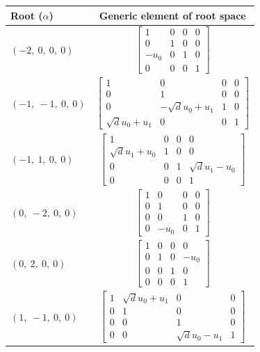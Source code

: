 \documentclass[11pt]{article}
\theoremstyle{definition}
\begin{document}
\noindent \begin{tabular}{|l|c|}
    \hline
    \textbf{Root ($\alpha$)} & \textbf{Generic element of root space} \\
    \hline
    $\left( -2, \  0, \  0, \  0\right)$ & $\left[\begin{matrix}1 & 0 & 0 & 0\\0 & 1 & 0 & 0\\- u_{0} & 0 & 1 & 0\\0 & 0 & 0 & 1\end{matrix}\right]$ \\
    \hline
    $\left( -1, \  -1, \  0, \  0\right)$ & $\left[\begin{matrix}1 & 0 & 0 & 0\\0 & 1 & 0 & 0\\0 & - \sqrt{d} u_{0} + u_{1} & 1 & 0\\\sqrt{d} u_{0} + u_{1} & 0 & 0 & 1\end{matrix}\right]$ \\
    \hline
    $\left( -1, \  1, \  0, \  0\right)$ & $\left[\begin{matrix}1 & 0 & 0 & 0\\\sqrt{d} u_{1} + u_{0} & 1 & 0 & 0\\0 & 0 & 1 & \sqrt{d} u_{1} - u_{0}\\0 & 0 & 0 & 1\end{matrix}\right]$ \\
    \hline
    $\left( 0, \  -2, \  0, \  0\right)$ & $\left[\begin{matrix}1 & 0 & 0 & 0\\0 & 1 & 0 & 0\\0 & 0 & 1 & 0\\0 & - u_{0} & 0 & 1\end{matrix}\right]$ \\
    \hline
    $\left( 0, \  2, \  0, \  0\right)$ & $\left[\begin{matrix}1 & 0 & 0 & 0\\0 & 1 & 0 & - u_{0}\\0 & 0 & 1 & 0\\0 & 0 & 0 & 1\end{matrix}\right]$ \\
    \hline
    $\left( 1, \  -1, \  0, \  0\right)$ & $\left[\begin{matrix}1 & \sqrt{d} u_{0} + u_{1} & 0 & 0\\0 & 1 & 0 & 0\\0 & 0 & 1 & 0\\0 & 0 & \sqrt{d} u_{0} - u_{1} & 1\end{matrix}\right]$ \\

\end{tabular}
\end{document}
